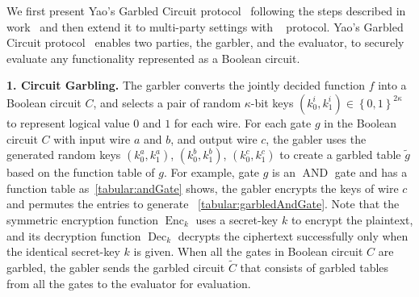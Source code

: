 



We first present Yao's Garbled Circuit protocol~\cite{yao1986generate} following the steps described in work~\cite{lindell2009proof} and then extend it to multi-party settings with \bmr~\cite{beaver1990round} protocol.
Yao's Garbled Circuit protocol~\cite{yao1986generate} enables two parties, the garbler, and the evaluator, to securely evaluate any functionality represented as a Boolean circuit.

\textbf{1. Circuit Garbling.}
The garbler converts the jointly decided function $f$ into a Boolean circuit $C$, and selects a pair of random $\kappa$-bit keys $\left(k_0^i,k_1^i\right)\in \left\{0,1\right\}^{2\kappa}$ to represent logical value $0$ and $1$ for each wire. For each gate $g$ in the Boolean circuit $C$ with input wire $a$ and $b$, and output wire $c$, the gabler uses the generated random keys $\left(k_0^a,k_1^a\right)$, $\left(k_0^b,k_1^b\right)$, $\left(k_0^c,k_1^c\right)$ to create a garbled table $\tilde{g}$ based on the function table of $g$. For example, gate $g$ is an $\operatorname{AND}$ gate and has a function table as~\autoref{tabular:andGate} shows, the gabler encrypts the keys of wire $c$ and permutes the entries to generate ~\autoref{tabular:garbledAndGate}. Note that the symmetric encryption function $\operatorname{Enc}_k$ uses a secret-key $k$ to encrypt the plaintext, and its decryption function $\operatorname{Dec}_k$ decrypts the ciphertext successfully only when the identical secret-key $k$ is given. When all the gates in Boolean circuit $C$ are garbled, the gabler sends the garbled circuit $\widetilde{C}$ that consists of garbled tables from all the gates to the evaluator for evaluation.

